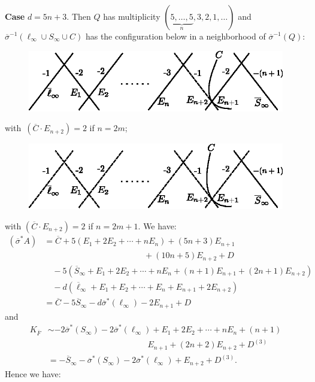 \subsubsection{}\label{chap3:3.5.3}
{\bf Case} $d=5n+3$. Then $Q$ has multiplicity
$(\underbrace{5,\ldots,5}_{n},3,2,1,\ldots)$ and
$\overline{\sigma}^{-1}(\ell_{\infty}\cup S_{\infty}\cup C)$ has the
configuration below in a neighborhood of $\overline{\sigma}^{-1}(Q)$:
\begin{figure}[H]
\centering
\includegraphics{figures/miyansi_fig40.eps}
\end{figure}
\noindent
with\pageoriginale\ $(\overline{C}\cdot E_{n+2})=2$ if $n=2m$;
\begin{figure}[H]
\centering
\includegraphics{figures/miyansi_fig41.eps}
\end{figure}
\noindent
with $(\overline{C}\cdot E_{n+2})=2$ if $n=2m+1$. We have:
\begin{align*}
(\overline{\sigma}^{\ast}A) &=
  \overline{C}+5(E_{1}+2E_{2}+\cdots+nE_{n}) + (5n+3)E_{n+1}\\ 
  & \hspace{5cm} + (10n+5)E_{n+2}+D\\ 
&\quad  -5(\overline{S}_{\infty}+E_{1} + 2E_{2}+ \cdots + nE_{n}+
  (n+1) E_{n+1}+(2n+1)E_{n+2})\\ 
&\quad
  -d(\overline{\ell}_{\infty}+E_{1}+E_{2}+\cdots+E_{n}+E_{n+1}+2E_{n+2})\\
&= \overline{C}-5\overline{S}_{\infty}-d\overline{\sigma}^{\ast}(\ell_{\infty})-2E_{n+1}+D
\end{align*}
and
\begin{align*}
K_{\overline{F}} &\sim
-2\overline{\sigma}^{\ast}(S_{\infty})-2 \overline{\sigma}^{\ast}
(\ell_{\infty}) + E_{1}+2E_{2}+\cdots+nE_{n}+(n+1)\\
& \hspace{5cm}E_{n+1}+(2n+2)E_{n+2}+D^{(3)}\\
&= -\overline{S}_{\infty}-\overline{\sigma}^{\ast}(S_{\infty})-2\overline{\sigma}^{\ast}(\ell_{\infty})+E_{n+2}+D^{(3)}.
\end{align*}
Hence we have:

